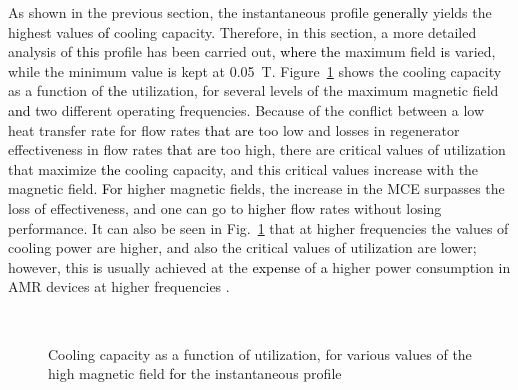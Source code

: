 \documentclass[referee]{svjour3}
\begin{document}
As shown in the previous section, the instantaneous profile \textcolor{black}{generally} yields the highest values \textcolor{black}{of} cooling capacity. Therefore, in this section, a more detailed analysis of \textcolor{black}{this} profile has been carried out, \textcolor{black}{where the} maximum field  \textcolor{black}{is} varied, while the minimum value is kept at \SI{0.05}{\tesla}. Figure~\ref{fig:qc_phi_inst} shows the cooling capacity as a function of \textcolor{black}{the} utilization, for several levels of the maximum magnetic field \textcolor{black}{and} two different operating frequencies. Because of the conflict between a low heat transfer rate for flow rates \textcolor{black}{that are} too low and losses in regenerator effectiveness in flow rates \textcolor{black}{that are} too high, there are critical values of utilization that maximize \textcolor{black}{the} cooling capacity, and this critical values increase with the magnetic field. \textcolor{black}{For} higher magnetic fields, the increase in the MCE surpasses the loss of effectiveness, and one can go to higher flow rates without losing performance. It can also be seen in Fig.~\ref{fig:qc_phi_inst} that at  higher frequencies the values of cooling power are higher, and also the critical values of utilization are lower; however, this \textcolor{black}{is} usually achieved at the \textcolor{black}{expense} of \textcolor{black}{a} higher power consumption in AMR devices at higher frequencies \cite{bib:lei15_study,NIKNIA2016601}.

\begin{figure}[!ht]
  \centering
{}
\,
  \caption{Cooling capacity as a function of utilization, for various values of the high magnetic field  \textcolor{black}{for} the instantaneous profile}
  \label{fig:qc_phi_inst}
\end{figure}
\end{document}
